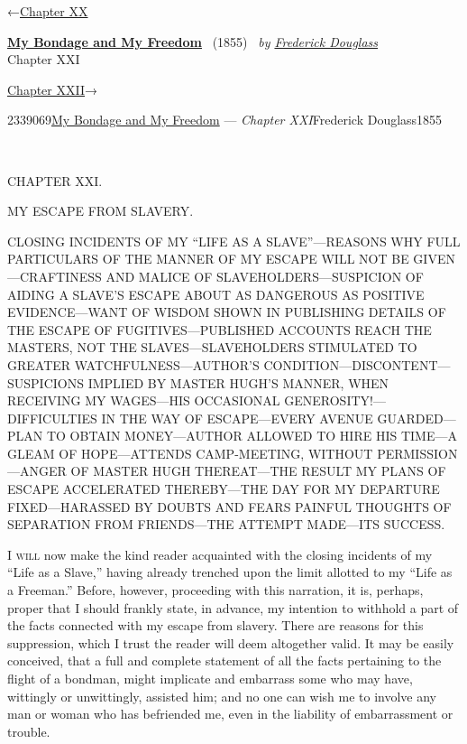 \hypertarget{headerContainer}{}
\hypertarget{navigationHeader}{}
\protect\hypertarget{headerprevious}{}{←\href{/wiki/My_Bondage_and_My_Freedom_(1855)/Chapter_XX}{Chapter
XX}}

\textbf{\protect\hypertarget{header_title_text}{}{\href{/wiki/My_Bondage_and_My_Freedom_(1855)}{My
Bondage and My Freedom}}} ~(1855)~ \emph{by
\href{/wiki/Author:Frederick_Douglass}{\protect\hypertarget{header_author_text}{}{{Frederick
Douglass}}}}\\
\protect\hypertarget{header_section_text}{}{Chapter XXI}

\protect\hypertarget{headernext}{}{\href{/wiki/My_Bondage_and_My_Freedom_(1855)/Chapter_XXII}{Chapter
XXII}→}

\hypertarget{navigationNotes}{}

\hypertarget{ws-data}{}
\protect\hypertarget{ws-article-id}{}{2339069}\protect\hypertarget{ws-title}{}{\href{/wiki/My_Bondage_and_My_Freedom_(1855)}{My
Bondage and My Freedom} --- \emph{Chapter
XXI}}\protect\hypertarget{ws-author}{}{Frederick
Douglass}\protect\hypertarget{ws-year}{}{1855}

{\protect\hypertarget{321}{}{}}

~

{CHAPTER XXI.}

MY ESCAPE FROM SLAVERY.

{CLOSING INCIDENTS OF MY ``LIFE AS A SLAVE''---REASONS WHY FULL
PARTICULARS OF THE MANNER OF MY ESCAPE WILL NOT BE GIVEN---CRAFTINESS
AND MALICE OF SLAVEHOLDERS---SUSPICION OF AIDING A SLAVE'S ESCAPE ABOUT
AS DANGEROUS AS POSITIVE EVIDENCE---WANT OF WISDOM SHOWN IN PUBLISHING
DETAILS OF THE ESCAPE OF FUGITIVES---PUBLISHED ACCOUNTS REACH THE
MASTERS, NOT THE SLAVES---SLAVEHOLDERS STIMULATED TO GREATER
WATCHFULNESS---AUTHOR'S CONDITION---DISCONTENT---SUSPICIONS IMPLIED BY
MASTER HUGH'S MANNER, WHEN RECEIVING MY WAGES---HIS OCCASIONAL
GENEROSITY!---DIFFICULTIES IN THE WAY OF ESCAPE---EVERY AVENUE
GUARDED---PLAN TO OBTAIN MONEY---AUTHOR ALLOWED TO HIRE HIS TIME---A
GLEAM OF HOPE---ATTENDS CAMP-MEETING, WITHOUT PERMISSION---ANGER OF
MASTER HUGH THEREAT---THE RESULT MY PLANS OF ESCAPE ACCELERATED
THEREBY---THE DAY FOR MY DEPARTURE FIXED---HARASSED BY DOUBTS AND FEARS
PAINFUL THOUGHTS OF SEPARATION FROM FRIENDS---THE ATTEMPT MADE---ITS
SUCCESS.}

\textsc{I will} now make the kind reader acquainted with the closing
incidents of my ``Life as a Slave,'' having already trenched upon the
limit allotted to my ``Life as a Freeman.'' Before, however, proceeding
with this narration, it is, perhaps, proper that I should frankly state,
in advance, my intention to withhold a part of the facts connected with
my escape from slavery. There are reasons for this suppression, which I
trust the reader will deem altogether valid. It may be easily conceived,
that a full and complete statement of all the facts pertaining to the
flight of a bondman, might implicate and embarrass some who may
{\protect\hypertarget{322}{}{}}have, wittingly or unwittingly, assisted
him; and no one can wish me to involve any man or woman who has
befriended me, even in the liability of embarrassment or trouble.


